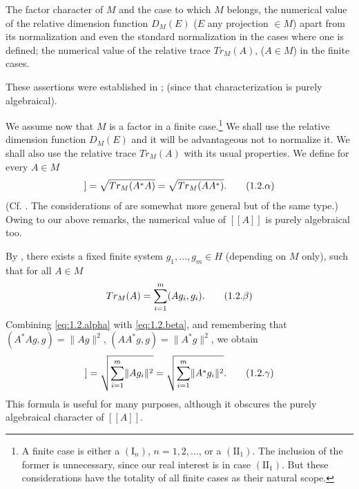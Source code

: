 \documentclass[b5paper,twoside]{article}
\theoremstyle{mvnplain}
\newcommand{\M}{\mathbf M}
\newcommand{\Hilbert}{\mathfrak H}
\newcommand{\Metric}[1]{\left[\!\left[#1\right]\!\right]}
\def\M{M}%
\def\Hilbert{H}%
\def\Metric#1{[[#1]]}%
\def\operatorname#1{#1}%
\def\mathfrak#1{#1}%
\begin{document}
The factor character of $\M$ and the case to which $\M$ belongs, the numerical
value of the relative dimension function $D_{\M}(E)$ ($E$ any projection
$\in\M$) apart from its normalization and even the standard normalization in
the cases where one is defined; the numerical value of the relative trace
$\operatorname{Tr}_{\M}(A)$, ($A\in\M$) in the finite cases.

These assertions were established in \cite[p.~145, Lemma~5.2.1;
p.~173, Theorem~IX]{ref5}; \cite[p.~219, Property~IV]{ref6} (since that
characterization is purely algebraical).

We assume now that $\M$ is a factor in a finite case.\footnote{A finite case is
either a $(\mathrm I_n)$, $n=1,2,\ldots$, or a $(\mathrm{II}_1)$.  The inclusion
of the former is unnecessary, since our real interest is in case
$(\mathrm{II}_1)$.  But these considerations have the totality of all finite
cases as their natural scope.}  We shall use the relative dimension function
$D_{\M}(E)$ and it will be advantageous not to normalize it.  We shall also use
the relative trace $\operatorname{Tr}_{\M}(A)$ with its usual properties.  We
define for every $A\in\M$
\begin{equation}
  \Metric{A}
  =\sqrt{\operatorname{Tr}_{\M}(A^*A)}
  =\sqrt{\operatorname{Tr}_{\M}(AA^*)}.
  \tag{1.2.\ensuremath{\alpha}}\label{eq:1.2.alpha}
\end{equation}
(Cf. \cite[p.~241, Lemma~4.3.2]{ref6}.  The considerations of
\cite[p.~102, Definition~1.3.1 and Theorem~II]{ref8} are somewhat more general
but of the same type.)  Owing to our above remarks, the numerical value of
$\Metric{A}$ is purely algebraical too.

By \cite[p.~235, Theorem~III]{ref6}, there exists a fixed finite system
$g_1,\ldots,g_m\in\Hilbert$ (depending on $\M$ only), such that for all
$A\in\M$
\begin{equation}
  \operatorname{Tr}_{\M}(A)=\sum_{i=1}^{m}(Ag_i,g_i).
  \tag{1.2.\ensuremath{\beta}}\label{eq:1.2.beta}
\end{equation}
Combining \eqref{eq:1.2.alpha} with \eqref{eq:1.2.beta}, and remembering that
$(A^*Ag,g)=\lVert Ag\rVert^2$, $(AA^*g,g)=\lVert A^*g\rVert^2$, we obtain
\begin{equation}
  \Metric{A}
  =\sqrt{\sum_{i=1}^{m}\lVert Ag_i\rVert^2}
  =\sqrt{\sum_{i=1}^{m}\lVert A^*g_i\rVert^2}.
  \tag{1.2.\ensuremath{\gamma}}\label{eq:1.2.gamma}
\end{equation}
This formula is useful for many purposes, although it obscures the purely
algebraical character of $\Metric{A}$.
\end{document}
